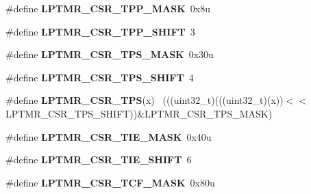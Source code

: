 \begin{DoxyCompactItemize}
\item 
\hypertarget{group___l_p_t_m_r___register___masks_ga020eee1550f2943c10d51f8b56930e62}{}\#define {\bfseries L\+P\+T\+M\+R\+\_\+\+C\+S\+R\+\_\+\+T\+P\+P\+\_\+\+M\+A\+S\+K}~0x8u\label{group___l_p_t_m_r___register___masks_ga020eee1550f2943c10d51f8b56930e62}

\item 
\hypertarget{group___l_p_t_m_r___register___masks_ga62be70d70bd4e88e26e5cc8437f6fd55}{}\#define {\bfseries L\+P\+T\+M\+R\+\_\+\+C\+S\+R\+\_\+\+T\+P\+P\+\_\+\+S\+H\+I\+F\+T}~3\label{group___l_p_t_m_r___register___masks_ga62be70d70bd4e88e26e5cc8437f6fd55}

\item 
\hypertarget{group___l_p_t_m_r___register___masks_ga3502ccff1cbdb70bb99b73c035ab1e19}{}\#define {\bfseries L\+P\+T\+M\+R\+\_\+\+C\+S\+R\+\_\+\+T\+P\+S\+\_\+\+M\+A\+S\+K}~0x30u\label{group___l_p_t_m_r___register___masks_ga3502ccff1cbdb70bb99b73c035ab1e19}

\item 
\hypertarget{group___l_p_t_m_r___register___masks_ga7759d842742bfedd91788d41ef12fb8d}{}\#define {\bfseries L\+P\+T\+M\+R\+\_\+\+C\+S\+R\+\_\+\+T\+P\+S\+\_\+\+S\+H\+I\+F\+T}~4\label{group___l_p_t_m_r___register___masks_ga7759d842742bfedd91788d41ef12fb8d}

\item 
\hypertarget{group___l_p_t_m_r___register___masks_gac9a5296718b4ce691d3ea7be07b20a79}{}\#define {\bfseries L\+P\+T\+M\+R\+\_\+\+C\+S\+R\+\_\+\+T\+P\+S}(x)                                              ~(((uint32\+\_\+t)(((uint32\+\_\+t)(x))$<$$<$L\+P\+T\+M\+R\+\_\+\+C\+S\+R\+\_\+\+T\+P\+S\+\_\+\+S\+H\+I\+F\+T))\&L\+P\+T\+M\+R\+\_\+\+C\+S\+R\+\_\+\+T\+P\+S\+\_\+\+M\+A\+S\+K)\label{group___l_p_t_m_r___register___masks_gac9a5296718b4ce691d3ea7be07b20a79}

\item 
\hypertarget{group___l_p_t_m_r___register___masks_gabb726cb43d5f6ee38339048c69a5f086}{}\#define {\bfseries L\+P\+T\+M\+R\+\_\+\+C\+S\+R\+\_\+\+T\+I\+E\+\_\+\+M\+A\+S\+K}~0x40u\label{group___l_p_t_m_r___register___masks_gabb726cb43d5f6ee38339048c69a5f086}

\item 
\hypertarget{group___l_p_t_m_r___register___masks_gaaedba0195b3abfcae6e8669f84f39d5d}{}\#define {\bfseries L\+P\+T\+M\+R\+\_\+\+C\+S\+R\+\_\+\+T\+I\+E\+\_\+\+S\+H\+I\+F\+T}~6\label{group___l_p_t_m_r___register___masks_gaaedba0195b3abfcae6e8669f84f39d5d}

\item 
\hypertarget{group___l_p_t_m_r___register___masks_ga13b5dd6085ca2a8cf0f06550b7557b6b}{}\#define {\bfseries L\+P\+T\+M\+R\+\_\+\+C\+S\+R\+\_\+\+T\+C\+F\+\_\+\+M\+A\+S\+K}~0x80u\label{group___l_p_t_m_r___register___masks_ga13b5dd6085ca2a8cf0f06550b7557b6b}


\end{DoxyCompactItemize}
